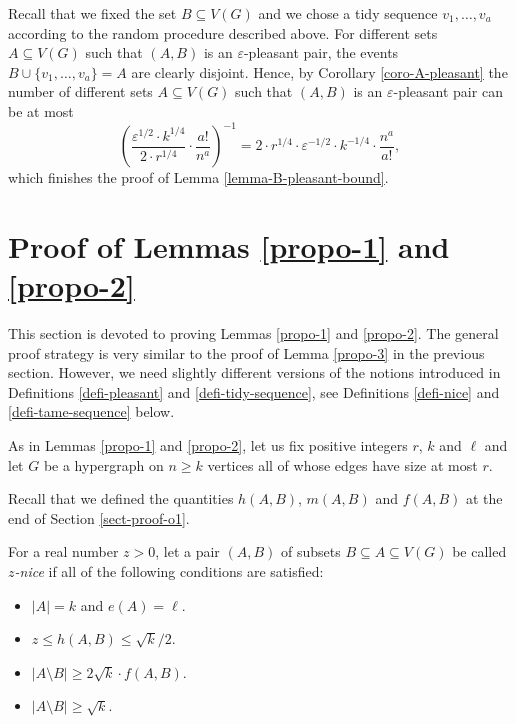 Recall that we fixed the set $B\subseteq V(G)$ and we chose a tidy sequence $v_1,\dots,v_a$ according to the random procedure described above. For different sets $A\subseteq V(G)$ such that $(A,B)$ is an $\varepsilon$-pleasant pair, the events $B\cup \lbrace v_1,\dots,v_a\rbrace=A$ are clearly disjoint. Hence, by Corollary \ref{coro-A-pleasant} the number of different sets $A\subseteq V(G)$ such that $(A,B)$ is an $\varepsilon$-pleasant pair can be at most
\[\left(\frac{\varepsilon^{1/2}\cdot k^{1/4}}{2\cdot r^{1/4}}\cdot \frac{a!}{n^a}\right)^{-1}=2\cdot r^{1/4}\cdot \varepsilon^{-1/2}\cdot k^{-1/4}\cdot \frac{n^a}{a!},\]
which finishes the proof of Lemma \ref{lemma-B-pleasant-bound}.

\section{Proof of Lemmas \ref{propo-1} and \ref{propo-2}}\label{sect-proof-propo-1-2}

This section is devoted to proving Lemmas \ref{propo-1} and \ref{propo-2}. The general proof strategy is very similar to the proof of Lemma \ref{propo-3} in the previous section. However, we need slightly different versions of the notions introduced in Definitions \ref{defi-pleasant} and \ref{defi-tidy-sequence}, see Definitions \ref{defi-nice} and \ref{defi-tame-sequence} below.

As in Lemmas \ref{propo-1} and \ref{propo-2}, let us fix positive integers $r$, $k$ and $\ell$ and let $G$ be a hypergraph on $n \geq k$ vertices all of whose edges have size at most $r$. 

Recall that we defined the quantities $h(A,B)$, $m(A, B)$ and $f(A,B)$ at the end of Section \ref{sect-proof-o1}.

\begin{definition}\label{defi-nice}For a real number $z>0$, let a pair $(A,B)$ of subsets $B\subseteq A\subseteq V(G)$ be called \emph{$z$-nice} if all of the following conditions are satisfied:
\begin{itemize}
\item[(i)] $\vert A\vert=k$ and $e(A)=\ell$.
\item[(ii)] $z\leq h(A,B)\leq \sqrt{k}/2$.
\item[(iii)] $\vert A\setminus B\vert\geq 2\sqrt{k}\cdot f(A,B)$.
\item[(iv)] $\vert A\setminus B\vert\geq \sqrt{k}$.
\end{itemize}
\end{definition}

